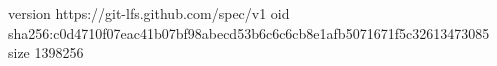 version https://git-lfs.github.com/spec/v1
oid sha256:c0d4710f07eac41b07bf98abecd53b6c6c6cb8e1afb5071671f5c32613473085
size 1398256
